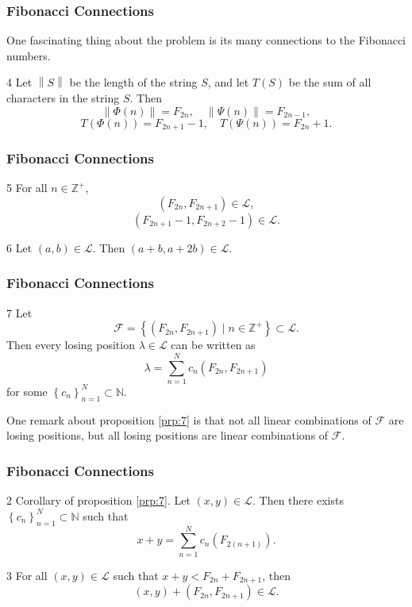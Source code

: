 \documentclass[11pt, letterpaper]{beamer}
\newenvironment{proposition}[2]{\begin{prp}{#1}{#2}}{\end{prp}}
\renewenvironment{corollary}[2]{\begin{crl}{#1}{#2}}{\end{crl}}
\begin{document}
\begin{frame}
	\frametitle{Fibonacci Connections}
	One fascinating thing about the problem is its many connections to the Fibonacci numbers.
	\pause
	\begin{proposition}{}{4}
		Let $\left\lVert S \right\rVert $ be the length of the string $S$, and let $T(S)$ be the sum of all characters in the string $S$. Then
		\[
			\left\lVert \Phi (n) \right\rVert =F_{2n},\quad \left\lVert \Psi (n) \right\rVert =F_{2n-1}
		,\]
		\[
		T(\Phi (n))=F_{2n+1}-1,\quad T(\Psi (n))=F_{2n}+1
		.\]
	\end{proposition}
\end{frame}
\begin{frame}
	\frametitle{Fibonacci Connections}
	\begin{proposition}{}{5}
		For all $n\in\mathbb{Z}^+$,
		\[
			\left( F_{2n},F_{2n+1} \right) \in \mathcal{L} 
		,\]
		\[
			\left( F_{2n+1}-1,F_{2n+2}-1 \right) \in \mathcal{L} 
		.\]
	\end{proposition}
	\pause
	\begin{proposition}{}{6}
		Let $(a,b)\in \mathcal{L} $. Then $(a+b,a+2b)\in \mathcal{L} $.
	\end{proposition}
\end{frame}
\begin{frame}
	\frametitle{Fibonacci Connections}
	\begin{proposition}{}{7}
		Let
		\[
			\mathcal{F} =\left\{ \left( F_{2n},F_{2n+1} \right)  \mid n\in\mathbb{Z}^+ \right\} \subset \mathcal{L} 
		.\]
		Then every losing position $\lambda \in \mathcal{L} $ can be written as
		\[
			\lambda =\sum_{n=1}^{N} c_n\left( F_{2n},F_{2n+1} \right) 
		\]
		for some $\left\{ c_{n} \right\}_{n=1}^N\subset \mathbb{N}$. 
	\end{proposition}
	\pause
	One remark about proposition \ref{prp:7} is that not all linear combinations of $\mathcal{F} $ are losing positions, but all losing positions are linear combinations of $\mathcal{F} $.
\end{frame}
\begin{frame}
	\frametitle{Fibonacci Connections}
	\begin{corollary}{}{2}
		Corollary of proposition \ref{prp:7}. Let $(x,y)\in \mathcal{L} $. Then there exists $\left\{ c_n \right\}_{n=1}^N\subset \mathbb{N}$ such that
		\[
			x+y=\sum_{n=1}^{N} c_n\left( F_{2(n+1)} \right) 
		.\]
	\end{corollary}
	\pause
	\begin{corollary}{}{3}
		For all $(x,y) \in \mathcal{L} $ such that $x+y < F_{2n}+F_{2n+1} $, then
		\[
			(x,y)+\left( F_{2n},F_{2n+1} \right) \in \mathcal{L} 
		.\]
	\end{corollary}
\end{frame}
\end{document}
